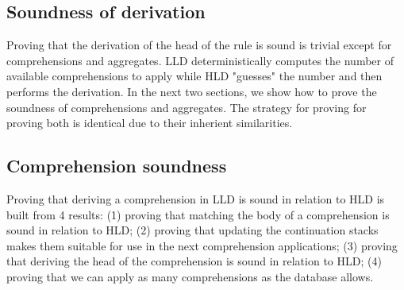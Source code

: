 
\subsection{Soundness of derivation}

Proving that the derivation of the head of the rule is sound is trivial except
for comprehensions and aggregates. LLD deterministically computes the number of
available comprehensions to apply while HLD "guesses" the number and then
performs the derivation. In the next two sections, we show how to prove the
soundness of comprehensions and aggregates. The strategy for proving for proving
both is identical due to their inherient similarities.

\subsection{Comprehension soundness}

Proving that deriving a comprehension in LLD is sound in relation to HLD is
built from 4 results: (1) proving that matching the body of a comprehension is
sound in relation to HLD; (2) proving that updating the continuation stacks
makes them suitable for use in the next comprehension applications; (3) proving
that deriving the head of the comprehension is sound in relation to HLD; (4)
proving that we can apply as many comprehensions as the database allows.

